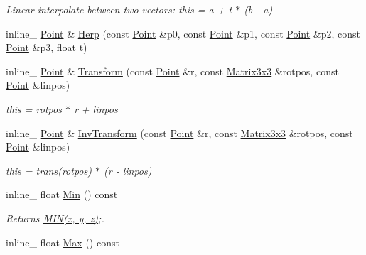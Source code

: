 \begin{DoxyCompactItemize}
\begin{DoxyCompactList}\small\item\em Linear interpolate between two vectors\+: this = a + t $\ast$ (b -\/ a) \end{DoxyCompactList}\item 
inline\+\_\+ \hyperlink{class_point}{Point} \& \hyperlink{class_point_aa9c7c852cd5bdf1e31ea744b5acf5e87}{Herp} (const \hyperlink{class_point}{Point} \&p0, const \hyperlink{class_point}{Point} \&p1, const \hyperlink{class_point}{Point} \&p2, const \hyperlink{class_point}{Point} \&p3, float t)
\item 
\hypertarget{class_point_a3425161ffac8c9a2b7fc5ab0c0c02483}{inline\+\_\+ \hyperlink{class_point}{Point} \& \hyperlink{class_point_a3425161ffac8c9a2b7fc5ab0c0c02483}{Transform} (const \hyperlink{class_point}{Point} \&r, const \hyperlink{class_matrix3x3}{Matrix3x3} \&rotpos, const \hyperlink{class_point}{Point} \&linpos)}\label{class_point_a3425161ffac8c9a2b7fc5ab0c0c02483}

\begin{DoxyCompactList}\small\item\em this = rotpos $\ast$ r + linpos \end{DoxyCompactList}\item 
\hypertarget{class_point_a3cc634ec4306c0ea6b9f319d084b2879}{inline\+\_\+ \hyperlink{class_point}{Point} \& \hyperlink{class_point_a3cc634ec4306c0ea6b9f319d084b2879}{Inv\+Transform} (const \hyperlink{class_point}{Point} \&r, const \hyperlink{class_matrix3x3}{Matrix3x3} \&rotpos, const \hyperlink{class_point}{Point} \&linpos)}\label{class_point_a3cc634ec4306c0ea6b9f319d084b2879}

\begin{DoxyCompactList}\small\item\em this = trans(rotpos) $\ast$ (r -\/ linpos) \end{DoxyCompactList}\item 
\hypertarget{class_point_ad493dd5f754f87a2b7e25e5b150545ac}{inline\+\_\+ float \hyperlink{class_point_ad493dd5f754f87a2b7e25e5b150545ac}{Min} () const }\label{class_point_ad493dd5f754f87a2b7e25e5b150545ac}

\begin{DoxyCompactList}\small\item\em Returns \hyperlink{_ice_types_8h_a3acffbd305ee72dcd4593c0d8af64a4f}{M\+I\+N(x, y, z)};. \end{DoxyCompactList}\item 
\hypertarget{class_point_a1ee0959084fad2caec2cc7c6ff42487c}{inline\+\_\+ float \hyperlink{class_point_a1ee0959084fad2caec2cc7c6ff42487c}{Max} () const }\label{class_point_a1ee0959084fad2caec2cc7c6ff42487c}


\end{DoxyCompactItemize}
